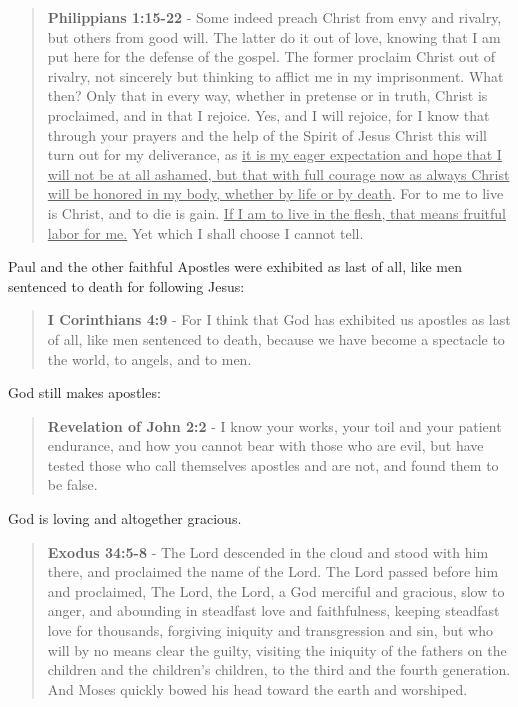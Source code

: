 \documentclass[11pt]{article}
\begin{document}
\begin{quote}
\textbf{Philippians 1:15-22} - Some indeed preach Christ from envy and rivalry, but others from good will. The latter do it out of love, knowing that I am put here for the defense of the gospel. The former proclaim Christ out of rivalry, not sincerely but thinking to afflict me in my imprisonment. What then? Only that in every way, whether in pretense or in truth, Christ is proclaimed, and in that I rejoice. Yes, and I will rejoice, for I know that through your prayers and the help of the Spirit of Jesus Christ this will turn out for my deliverance, as \uline{it is my eager expectation and hope that I will not be at all ashamed, but that with full courage now as always Christ will be honored in my body, whether by life or by death}. For to me to live is Christ, and to die is gain. \uline{If I am to live in the flesh, that means fruitful labor for me.} Yet which I shall choose I cannot tell.
\end{quote}

Paul and the other faithful Apostles were exhibited as last of all, like men sentenced to death for following Jesus:

\begin{quote}
\textbf{I Corinthians 4:9} - For I think that God has exhibited us apostles as last of all, like men sentenced to death, because we have become a spectacle to the world, to angels, and to men.
\end{quote}

God still makes apostles:

\begin{quote}
\textbf{Revelation of John 2:2} - I know your works, your toil and your patient endurance, and how you cannot bear with those who are evil, but have tested those who call themselves apostles and are not, and found them to be false.
\end{quote}

God is loving and altogether gracious.

\begin{quote}
\textbf{Exodus 34:5-8} - The Lord descended in the cloud and stood with him there, and proclaimed the name of the Lord. The Lord passed before him and proclaimed, The Lord, the Lord, a God merciful and gracious, slow to anger, and abounding in steadfast love and faithfulness, keeping steadfast love for thousands, forgiving iniquity and transgression and sin, but who will by no means clear the guilty, visiting the iniquity of the fathers on the children and the children's children, to the third and the fourth generation. And Moses quickly bowed his head toward the earth and worshiped.
\end{quote}
\end{document}
